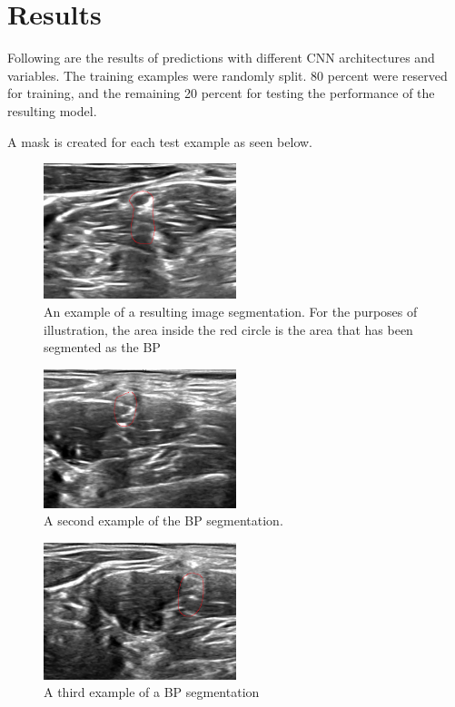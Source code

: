 \documentclass[letterpaper]{article}
\begin{document}
\section{Results}
Following are the results of predictions with different CNN architectures and variables.
The training examples were randomly split. 80 percent were reserved for training, and the remaining 20 percent for testing the performance of the resulting model.

A mask is created for each test example as seen below.

 \begin{figure}[H]
  \centerline{\includegraphics[width=0.5\textwidth]{Images/SegmentExample1.png}}
  \caption{An example of a resulting image segmentation. For the purposes of illustration, the area inside the red circle is the area that has been segmented as the BP}
  \label{fig:BPSegmentation1}
\end{figure}

 \begin{figure}[H]
  \centerline{\includegraphics[width=0.5\textwidth]{Images/SegmentExample2.png}}
  \caption{A second example of the BP segmentation.}
  \label{fig:BPSegmentation2}
\end{figure}

 \begin{figure}[H]
  \centerline{\includegraphics[width=0.5\textwidth]{Images/SegmentExample3.png}}
  \caption{A third example of a BP segmentation}
  \label{fig:BPSegmentation3}
\end{figure}
\end{document}
